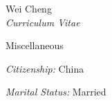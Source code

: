 \documentclass[10pt]{article}
\begin{document}
\begin{cv}{Wei Cheng\\{\large \itshape Curriculum Vitae}}
\setlength{\oldcvlabelwidth}{\cvlabelwidth}
\setlength{\cvlabelwidth}{1em}
\begin{cvlist}{Miscellaneous}
\item \textit{Citizenship:} China
\item \textit{Marital Status:} Married
\end{cvlist}
\setlength{\cvlabelwidth}{\oldcvlabelwidth}

\end{cv}
\end{document}
